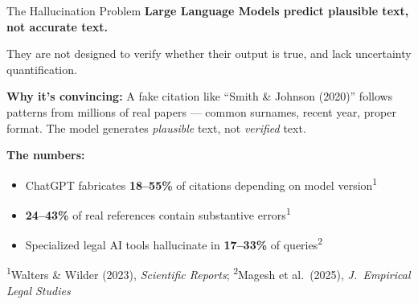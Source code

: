 \documentclass[aspectratio=169]{beamer}
\begin{document}

\begin{frame}{The Hallucination Problem}
    \textbf{Large Language Models predict plausible text, not accurate text.}

    \vspace{0.5em}
    They are not designed to verify whether their output is true, and lack uncertainty quantification.

    \vspace{1em}
    \textbf{Why it's convincing:} A fake citation like ``Smith \& Johnson (2020)'' follows patterns from millions of real papers --- common surnames, recent year, proper format. The model generates \textit{plausible} text, not \textit{verified} text.

    \vspace{1em}
  \textbf{The numbers:}
  \begin{itemize}
      \item ChatGPT fabricates \textbf{18--55\%} of citations depending on model version\textsuperscript{1}
      \item \textbf{24--43\%} of real references contain substantive errors\textsuperscript{1}
      \item Specialized legal AI tools hallucinate in \textbf{17--33\%} of queries\textsuperscript{2}
  \end{itemize}

  \vspace{0.3em}
  {\scriptsize \textsuperscript{1}Walters \& Wilder (2023), \textit{Scientific Reports};
  \textsuperscript{2}Magesh et al.\ (2025), \textit{J.\ Empirical Legal Studies}}
\end{frame}
\end{document}
